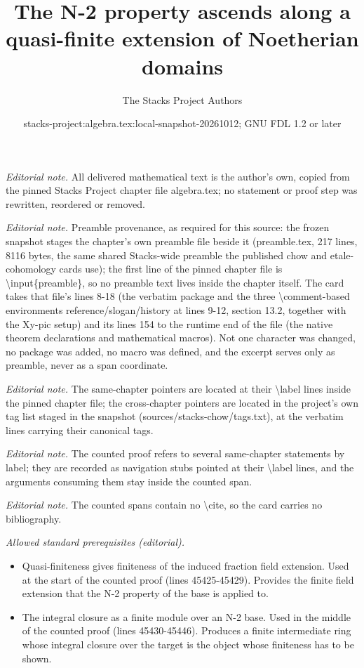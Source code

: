 \documentclass[10pt,a4paper]{amsart}
\title{The N-2 property ascends along a quasi-finite extension of Noetherian domains}
\author{The Stacks Project Authors}
\date{stacks-project:algebra.tex:local-snapshot-20261012; GNU FDL 1.2 or later}
\theoremstyle{plain}
\theoremstyle{definition}
\theoremstyle{remark}
\numberwithin{equation}{subsection}
\begin{document}
\maketitle
\noindent\textit{Editorial note.} All delivered mathematical text is the author's own, copied from the pinned Stacks Project chapter file algebra.tex; no statement or proof step was rewritten, reordered or removed.\par\medskip
\noindent\textit{Editorial note.} Preamble provenance, as required for this source: the frozen snapshot stages the chapter's own preamble file beside it (preamble.tex, 217 lines, 8116 bytes, the same shared Stacks-wide preamble the published chow and etale-cohomology cards use); the first line of the pinned chapter file is \textbackslash{}input\{preamble\}, so no preamble text lives inside the chapter itself. The card takes that file's lines 8-18 (the verbatim package and the three \textbackslash{}comment-based environments reference/slogan/history at lines 9-12, section 13.2, together with the Xy-pic setup) and its lines 154 to the runtime end of the file (the native theorem declarations and mathematical macros). Not one character was changed, no package was added, no macro was defined, and the excerpt serves only as preamble, never as a span coordinate.\par\medskip
\noindent\textit{Editorial note.} The same-chapter pointers are located at their \textbackslash{}label lines inside the pinned chapter file; the cross-chapter pointers are located in the project's own tag list staged in the snapshot (sources/stacks-chow/tags.txt), at the verbatim lines carrying their canonical tags.\par\medskip
\noindent\textit{Editorial note.} The counted proof refers to several same-chapter statements by label; they are recorded as navigation stubs pointed at their \textbackslash{}label lines, and the arguments consuming them stay inside the counted span.\par\medskip
\noindent\textit{Editorial note.} The counted spans contain no \textbackslash{}cite, so the card carries no bibliography.\par\medskip
\noindent\textit{Allowed standard prerequisites (editorial).}\begin{itemize}
\item Quasi-finiteness gives finiteness of the induced fraction field extension. Used at the start of the counted proof (lines 45425-45429). Provides the finite field extension that the N-2 property of the base is applied to.
\item The integral closure as a finite module over an N-2 base. Used in the middle of the counted proof (lines 45430-45446). Produces a finite intermediate ring whose integral closure over the target is the object whose finiteness has to be shown.
\end{itemize}\medskip
\end{document}
